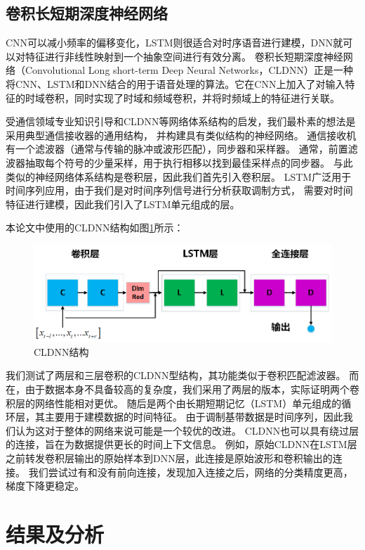 \subsection{卷积长短期深度神经网络}
CNN可以减小频率的偏移变化，LSTM则很适合对时序语音进行建模，DNN就可以对特征进行非线性映射到一个抽象空间进行有效分离。
卷积长短期深度神经网络（Convolutional Long short-term Deep Neural Networks，CLDNN）正是一种将CNN、LSTM和DNN结合的用于语音处理的算法。它在CNN上加入了对输入特征的时域卷积，同时实现了时域和频域卷积，并将时频域上的特征进行关联。\par

受通信领域专业知识引导和CLDNN等网络体系结构的启发，我们最朴素的想法是采用典型通信接收器的通用结构，
并构建具有类似结构的神经网络。
通信接收机有一个滤波器（通常与传输的脉冲或波形匹配），同步器和采样器。
通常，前置滤波器抽取每个符号的少量采样，用于执行相移以找到最佳采样点的同步器。
与此类似的神经网络体系结构是卷积层，因此我们首先引入卷积层。
LSTM广泛用于时间序列应用，由于我们是对时间序列信号进行分析获取调制方式，
需要对时间特征进行建模，因此我们引入了LSTM单元组成的层。
 \par
本论文中使用的CLDNN结构如图\ref{sec:fig_5_6}所示：\par
\begin{figure}[!h]
	\centering
	\includegraphics[scale=0.6]{figures/chapter_5/fig_5_6}
	\caption{CLDNN结构}\label{sec:fig_5_6}
\end{figure}
我们测试了两层和三层卷积的CLDNN型结构，其功能类似于卷积匹配滤波器。
而在，由于数据本身不具备较高的复杂度，我们采用了两层的版本，实际证明两个卷积层的网络性能相对更优。
随后是两个由长期短期记忆（LSTM）单元组成的循环层，其主要用于建模数据的时间特征。
由于调制基带数据是时间序列，因此我们认为这对于整体的网络来说可能是一个较优的改进。
CLDNN也可以具有绕过层的连接，旨在为数据提供更长的时间上下文信息。
例如，原始CLDNN在LSTM层之前转发卷积层输出的原始样本到DNN层，此连接是原始波形和卷积输出的连接。
我们尝试过有和没有前向连接，发现加入连接之后，网络的分类精度更高，梯度下降更稳定。\par

\section{结果及分析}

